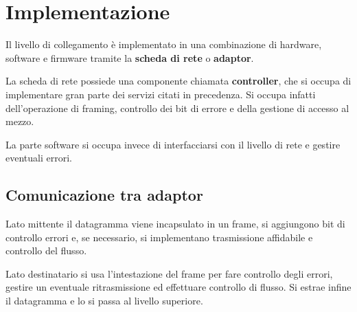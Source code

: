 \section{Implementazione}
Il livello di collegamento è implementato in una combinazione di 
hardware, software e firmware tramite la \textbf{scheda di rete} o 
\textbf{adaptor}.

La scheda di rete possiede una componente chiamata \textbf{controller},
che si occupa di implementare gran parte dei servizi citati in 
precedenza. Si occupa infatti dell'operazione di framing, controllo
dei bit di errore e della gestione di accesso al mezzo.

La parte software si occupa invece di interfacciarsi con il livello di
rete e gestire eventuali errori.

\subsection{Comunicazione tra adaptor}
Lato mittente il datagramma viene incapsulato in un frame, si 
aggiungono bit di controllo errori e, se necessario, si implementano
trasmissione affidabile e controllo del flusso.

Lato destinatario si usa l'intestazione del frame per fare controllo
degli errori, gestire un eventuale ritrasmissione ed effettuare 
controllo di flusso. Si estrae infine il datagramma e lo si passa al
livello superiore.

